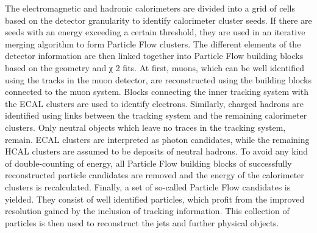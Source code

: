 The electromagnetic and hadronic calorimeters are divided into a grid of cells based on the detector granularity to identify calorimeter cluster seeds. If there are seeds with an energy exceeding a certain threshold, they are used in an iterative merging algorithm to form Particle Flow clusters. The different elements of the detector information are then linked together into Particle Flow building blocks based on the geometry and χ 2 fits. At first, muons, which can be well identified using the tracks in the muon detector, are reconstructed using the building blocks connected to the muon system. Blocks connecting the inner tracking system with the ECAL clusters are used to identify electrons. Similarly, charged hadrons are identified using links between the tracking system and the remaining calorimeter clusters. Only neutral objects which leave no traces in the tracking system, remain. ECAL clusters are interpreted as photon candidates, while the remaining HCAL clusters are assumed to be deposits of neutral hadrons. To avoid any kind of double-counting of energy, all Particle Flow building blocks of successfully reconstructed particle candidates are removed and the energy of the calorimeter clusters is recalculated. Finally, a set of so-called Particle Flow candidates is yielded. They consist of well identified particles, which profit from the improved resolution gained by the inclusion of tracking information. This collection of particles is then used to reconstruct the jets and further physical objects.

